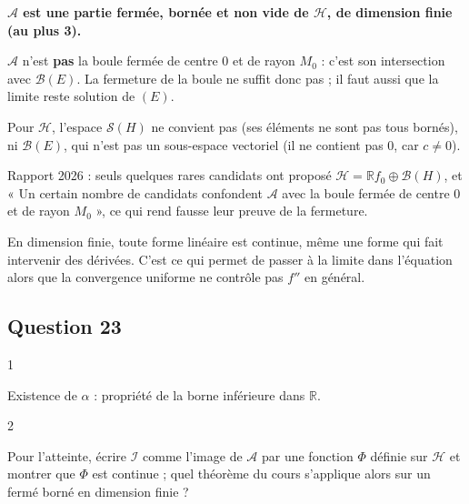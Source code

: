 \documentclass[11pt,a4paper]{article}
\begin{document}
\textbf{\(\mathcal A\) est une partie fermée, bornée et non vide de \(\mathcal H\), de dimension finie (au plus 3).}

\begin{piege}

\(\mathcal A\) n'est \textbf{pas} la boule fermée de centre \(0\) et de rayon \(M_0\) : c'est son intersection avec \(\mathcal B(E)\). La fermeture de la boule ne suffit donc pas ; il faut aussi que la limite reste solution de \((E)\).

Pour \(\mathcal H\), l'espace \(\mathcal S(H)\) ne convient pas (ses éléments ne sont pas tous bornés), ni \(\mathcal B(E)\), qui n'est pas un sous-espace vectoriel (il ne contient pas \(0\), car \(c\neq0\)).

\end{piege}

\begin{jury}

Rapport 2026 : seuls quelques rares candidats ont proposé \(\mathcal H=\mathbb Rf_0\oplus\mathcal B(H)\), et « Un certain nombre de candidats confondent \(\mathcal A\) avec la boule fermée de centre 0 et de rayon \(M_0\) », ce qui rend fausse leur preuve de la fermeture.

\end{jury}

\begin{methode}

En dimension finie, toute forme linéaire est continue, même une forme qui fait intervenir des dérivées. C'est ce qui permet de passer à la limite dans l'équation alors que la convergence uniforme ne contrôle pas \(f''\) en général.

\end{methode}

\hypertarget{question-23}{%
\subsection{Question 23}\label{question-23}}

\begin{indication}{1}

Existence de \(\alpha\) : propriété de la borne inférieure dans \(\mathbb R\).

\end{indication}

\begin{indication}{2}

Pour l'atteinte, écrire \(\mathcal I\) comme l'image de \(\mathcal A\) par une fonction \(\Phi\) définie sur \(\mathcal H\) et montrer que \(\Phi\) est continue ; quel théorème du cours s'applique alors sur un fermé borné en dimension finie ?

\end{indication}
\end{document}
